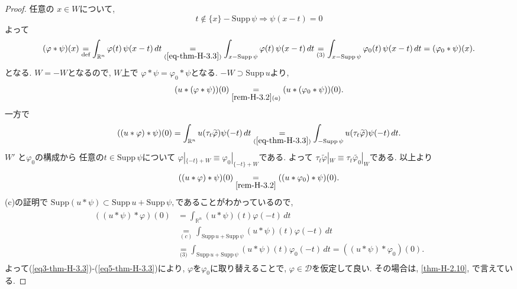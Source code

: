 \documentclass[dvipdfmx,a4paper,11pt]{article} %
\theoremstyle{definition}
\theoremstyle{remark}
\numberwithin{equation}{section}
\begin{document}
\begin{proof}
任意の \(x \in W\)について, 
\begin{equation}
\label{eq-thm-H-3.3}
t \notin \{x\} - \mathrm{Supp}\, \psi
\Rightarrow
\psi(x - t) = 0
 \end{equation}
 よって
\[
 (\varphi \ast \psi)(x)
\underset{\text{def}}{=} \int_{\mathbb{R}^n} \varphi(t)\, \psi(x - t)\, dt
\underset{(\ref{eq-thm-H-3.3})}{=} \int_{x - \mathrm{Supp}\, \psi} \varphi(t)\, \psi(x - t)\, dt
\underset{\text{(3)}}{=}  \int_{x - \mathrm{Supp}\, \psi} \varphi_0(t)\, \psi(x - t)\, dt
\underset{}{=} (\varphi_0 \ast \psi)(x).
\]
となる. 
\( W = -W \)となるので, $W$上で \( \varphi \ast \psi = \varphi_0 \ast \psi \)となる. 
\(-W \supset \mathrm{Supp}\, u\)より, 
\begin{equation}
\label{eq3-thm-H-3.3}
(u \ast (\varphi \ast \psi))(0) 
\underset{\ref{rem-H-3.2}(a)}{=} 
(u \ast (\varphi_0 \ast \psi))(0).
\end{equation}
一方で
\[
((u \ast \varphi) \ast \psi)(0)
\underset{}{=}
 \int_{\mathbb{R}^n} u(\tau_t \widetilde{\varphi}) \psi(-t) \, dt
\underset{(\ref{eq-thm-H-3.3})}{=}
  \int_{-\mathrm{Supp}\, \psi} 
 u(\tau_t \widetilde{\varphi}) \psi(-t) \, dt.
\]
\(W'\) と\(\varphi_0\)の構成から
任意の\( t \in \mathrm{Supp}\, \psi\)について
\(\varphi|_{\{ -t\} + W} \equiv \varphi_0|_{ \{ -t\} + W}\)である. 
よって
$\tau_t \widetilde{\varphi}|_W \equiv \tau_t \widetilde{\varphi_0}|_W$である.
以上より
\begin{equation}
\label{eq4-thm-H-3.3}
 ((u \ast \varphi) \ast \psi)(0) 
 \underset{\ref{rem-H-3.2}}{=} 
  ((u \ast \varphi_0) \ast \psi)(0).
\end{equation}
(c)の証明で \(\mathrm{Supp}(u \ast \psi) \subset \mathrm{Supp}\, u + \mathrm{Supp}\, \psi,\)であることがわかっているので,
\begin{align}
\begin{split}
\label{eq5-thm-H-3.3}
((u \ast \psi) \ast \varphi)(0)
&= \int_{\mathbb{R}^n} (u \ast \psi)(t) \varphi(-t) \, dt \\
&\underset{(c)}{=} \int_{\mathrm{Supp}\, u + \mathrm{Supp}\, \psi} (u \ast \psi)(t) \varphi(-t) \, dt \\
&\underset{\text{(3)}}{=}  \int_{\mathrm{Supp}\, u + \mathrm{Supp}\, \psi} (u \ast \psi)(t) \varphi_0(-t) \, dt
= ((u \ast \psi) \ast \varphi_0)(0).
\end{split}
\end{align}
よって(\ref{eq3-thm-H-3.3})-(\ref{eq5-thm-H-3.3})により, $\varphi$を$\varphi_0$に取り替えることで,  $\varphi \in \mathcal{D}$を仮定して良い.
その場合は, \ref{thm-H-2.10}, \cite[Theorem 6.30 (c)]{Rud}で言えている. 
\end{proof}
\end{document}
